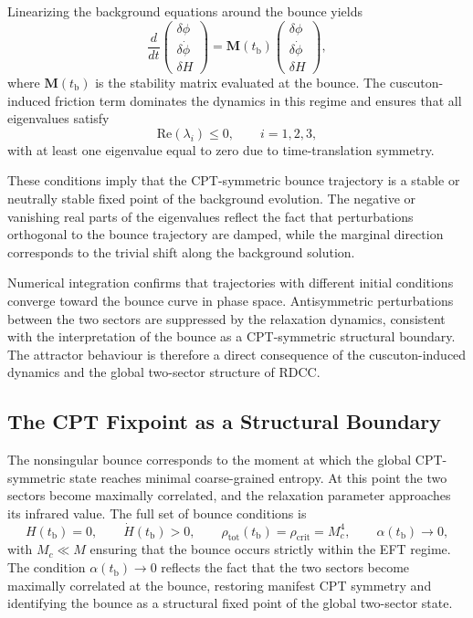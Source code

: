 \documentclass[11pt,a4paper]{article}
\begin{document}
Linearizing the background equations around the bounce yields
\begin{equation}
    \frac{d}{dt}
    \begin{pmatrix}
        \delta\phi \\
        \delta\dot{\phi} \\
        \delta H
    \end{pmatrix}
    =
    \mathbf{M}(t_{\mathrm{b}})
    \begin{pmatrix}
        \delta\phi \\
        \delta\dot{\phi} \\
        \delta H
    \end{pmatrix},
\end{equation}
where \(\mathbf{M}(t_{\mathrm{b}})\) is the stability matrix evaluated at the
bounce. The cuscuton-induced friction term dominates the dynamics in this
regime and ensures that all eigenvalues satisfy
\begin{equation}
    \mathrm{Re}(\lambda_{i}) \leq 0,
    \qquad i = 1,2,3,
\end{equation}
with at least one eigenvalue equal to zero due to time-translation symmetry.

These conditions imply that the CPT-symmetric bounce trajectory is a stable or
neutrally stable fixed point of the background evolution. The negative or
vanishing real parts of the eigenvalues reflect the fact that perturbations
orthogonal to the bounce trajectory are damped, while the marginal direction
corresponds to the trivial shift along the background solution.

Numerical integration confirms that trajectories with different initial
conditions converge toward the bounce curve in phase space. Antisymmetric
perturbations between the two sectors are suppressed by the relaxation
dynamics, consistent with the interpretation of the bounce as a CPT-symmetric
structural boundary. The attractor behaviour is therefore a direct consequence
of the cuscuton-induced dynamics and the global two-sector structure of RDCC.

\subsection{The CPT Fixpoint as a Structural Boundary}

The nonsingular bounce corresponds to the moment at which the global
CPT-symmetric state reaches minimal coarse-grained entropy. At this point the
two sectors become maximally correlated, and the relaxation parameter approaches
its infrared value. The full set of bounce conditions is
\begin{equation}
    H(t_{\mathrm{b}}) = 0,
    \qquad
    \dot{H}(t_{\mathrm{b}}) > 0,
    \qquad
    \rho_{\mathrm{tot}}(t_{\mathrm{b}}) = \rho_{\mathrm{crit}} = M_{c}^{4},
    \qquad
    \alpha(t_{\mathrm{b}}) \to 0,
\end{equation}
with \(M_{c} \ll M\) ensuring that the bounce occurs strictly within the EFT
regime. The condition \(\alpha(t_{\mathrm{b}}) \to 0\) reflects the fact that the
two sectors become maximally correlated at the bounce, restoring manifest CPT
symmetry and identifying the bounce as a structural fixed point of the global
two-sector state.
\end{document}
